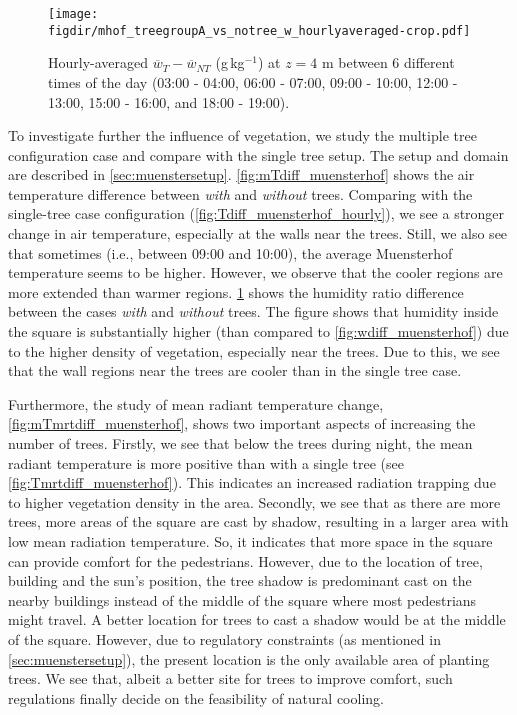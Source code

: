 	\begin{figure}[p]
		\centering
		\texttt{[image: \\figdir/mhof\_treegroupA\_vs\_notree\_w\_hourlyaveraged-crop.pdf]}
		\caption{Hourly-averaged $\overline{w}_{T}-\overline{w}_{\textit{NT}}$ (g\,kg$^{-1}$) at $z=4$ m between 6 different times of the day (03:00 - 04:00, 06:00 - 07:00, 09:00 - 10:00, 12:00 - 13:00, 15:00 - 16:00, and 18:00 - 19:00).}
		\label{fig:mwdiff_muensterhof}
	\end{figure}




To investigate further the influence of vegetation, we study the multiple tree configuration case and compare with the single tree setup. The setup and domain are described in \cref{sec:muenstersetup}. \cref{fig:mTdiff_muensterhof} shows the air temperature difference between \textit{with} and \textit{without} trees. Comparing with the single-tree case configuration (\cref{fig:Tdiff_muensterhof_hourly}), we see a stronger change in air temperature, especially at the walls near the trees. Still, we also see that sometimes (i.e., between 09:00 and 10:00), the average Muensterhof temperature seems to be higher. However, we observe that the cooler regions are more extended than warmer regions. \cref{fig:mwdiff_muensterhof} shows the humidity ratio difference between the cases \textit{with} and \textit{without} trees. The figure shows that humidity inside the square is substantially higher (than compared to \cref{fig:wdiff_muensterhof}) due to the higher density of vegetation, especially near the trees. Due to this, we see that the wall regions near the trees are cooler than in the single tree case.

Furthermore, the study of mean radiant temperature change, \cref{fig:mTmrtdiff_muensterhof}, shows two important aspects of increasing the number of trees. Firstly, we see that below the trees during night, the mean radiant temperature is more positive than with a single tree (see \cref{fig:Tmrtdiff_muensterhof}). This indicates an increased radiation trapping due to higher vegetation density in the area. Secondly, we see that as there are more trees, more areas of the square are cast by shadow, resulting in a larger area with low mean radiation temperature. So, it indicates that more space in the square can provide comfort for the pedestrians. However, due to the location of tree, building and the sun's position, the tree shadow is predominant cast on the nearby buildings instead of the middle of the square where most pedestrians might travel. A better location for trees to cast a shadow would be at the middle of the square. However, due to regulatory constraints (as mentioned in \cref{sec:muenstersetup}), the present location is the only available area of planting trees. We see that, albeit a better site for trees to improve comfort, such regulations finally decide on the feasibility of natural cooling.
	
